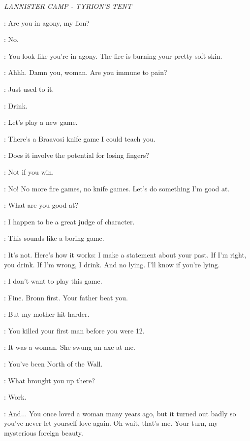 \scene

\textit{LANNISTER CAMP - TYRION'S TENT} 


\SHAE: Are you in agony, my lion? 

\TYRION: No. 

\SHAE: You look like you're in agony. The fire is burning your pretty soft skin. 

\TYRION:  Ahhh. Damn you, woman. Are you immune to pain? 

\SHAE: Just used to it. 

\BRONN: Drink. 

\TYRION: Let's play a new game. 

\BRONN: There's a Braavosi knife game I could teach you.

\TYRION: Does it involve the potential for losing fingers? 

\BRONN: Not if you win. 

\TYRION: No! No more fire games, no knife games. Let's do something I'm good at. 

\SHAE: What are you good at? 

\TYRION: I happen to be a great judge of character. 

\BRONN: This sounds like a boring game. 

\TYRION: It's not. Here's how it works: I make a statement about your past. If I'm right, you drink. If I'm wrong, I drink. And no lying. I'll know if you're lying. 

\SHAE: I don't want to play this game. 

\TYRION: Fine. Bronn first. Your father beat you. 

\BRONN:  But my mother hit harder. 

\TYRION: You killed your first man before you were 12. 

\BRONN: It was a woman. She swung an axe at me. 


\TYRION: You've been North of the Wall. 


\SHAE: What brought you up there? 

\BRONN: Work. 

\TYRION: And$\ldots$ You once loved a woman many years ago, but it turned out badly so you've never let yourself love again. Oh wait, that's me. Your turn, my mysterious foreign beauty. 

